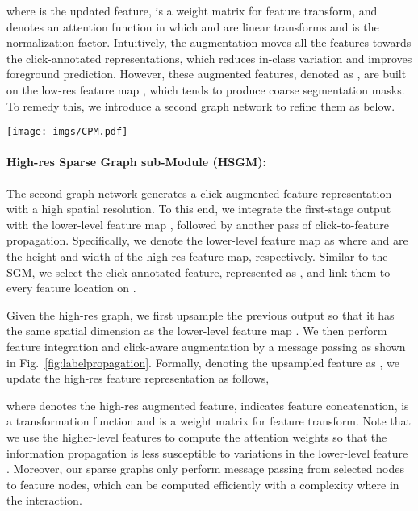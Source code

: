 \documentclass{bmvc2k}
\begin{document}
where  is the updated feature,  is a weight matrix for feature transform, and   denotes an attention function in which  and  are linear transforms and  is the normalization factor. 
Intuitively, the augmentation moves all the features towards the click-annotated representations, which reduces in-class variation and improves foreground prediction. However, these augmented features, denoted as , are built on the low-res feature map , which tends to produce coarse segmentation masks. To remedy this, we introduce a second graph network to refine them as below. 

\begin{figure*}[!t]
	\centering
	\texttt{[image: imgs/CPM.pdf]}
	\caption{The structure of sparse graph sub-module(SGM) and high-resolution sparse graph sub-module(HSGM).  and  represent the height and width of the feature map.  and  represent the channel of higher-level and lower-level feature maps, respectively.  is the number of user clicks. For simplicity, we ignore the reshape operation.}
	\label{fig:labelpropagation}
\end{figure*}

\paragraph{High-res Sparse Graph sub-Module (HSGM):}
The second graph network generates a click-augmented feature representation with a high spatial resolution. To this end, we integrate the first-stage output  with the lower-level feature map , followed by another pass of click-to-feature propagation. 
Specifically, we denote the lower-level feature map as 
 where  and  are the height and width of the high-res feature map, respectively. Similar to the SGM, we select the click-annotated feature, represented as , and link them to every feature location on .

Given the high-res graph, we first upsample the previous output  so that it has the same spatial dimension as the lower-level feature map . We then perform feature integration and click-aware augmentation by a message passing as shown in Fig.~\ref{fig:labelpropagation}. Formally, denoting the upsampled feature as , we update the high-res feature representation as follows,

where  denotes the high-res augmented feature,  indicates feature concatenation,  is a transformation function and  is a weight matrix for feature transform. Note that we use the higher-level features  to compute the attention weights so that the information propagation is less susceptible to variations in the lower-level feature . Moreover, our sparse graphs only perform message passing from  selected nodes to  feature nodes, which can be computed efficiently with a complexity  where  in the interaction. 
\end{document}
